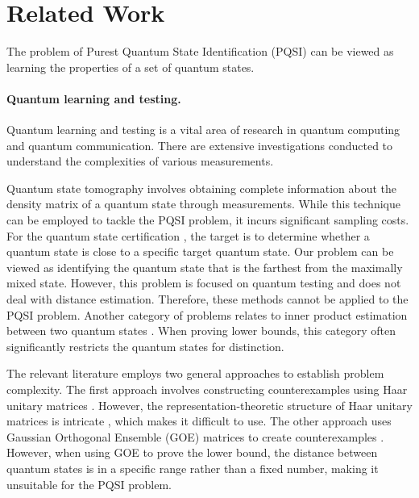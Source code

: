 \section{Related Work}
\label{sec: related_work}

The problem of Purest Quantum State Identification (PQSI) can be viewed as learning the properties of a set of quantum states.

\paragraph{Quantum learning and testing.}  Quantum learning and testing \cite{montanaro2013survey, aharonov2022quantum} is a vital area of research in quantum computing and quantum communication. There are extensive investigations conducted to understand the complexities of various measurements. 

Quantum state tomography \cite{banaszek2013focus, gross2010quantum, chen2023does, chen2022exponential} involves obtaining complete information about the density matrix of a quantum state through measurements. While this technique can be employed to tackle the PQSI problem, it incurs significant sampling costs. For the quantum state certification \cite{bubeck2020entanglement,chen2022tight,wright2016learn,chen2022toward}, the target is to determine whether a quantum state is close to a specific target quantum state. Our problem can be viewed as identifying the quantum state that is the farthest from the maximally mixed state. However, this problem is focused on quantum testing and does not deal with distance estimation. Therefore, these methods cannot be applied to the PQSI problem. Another category of problems relates to inner product estimation between two quantum states \cite{anshu2022distributed,hinsche2024efficient, zhu2022cross,huang2020predicting}. When proving lower bounds, this category often significantly restricts the quantum states for distinction. 

The relevant literature employs two general approaches to establish problem complexity. The first approach involves constructing counterexamples using Haar unitary matrices \cite{anshu2022distributed,chen2022exponential,chen2022toward, bubeck2020entanglement}. However, the representation-theoretic structure of Haar unitary matrices is intricate \cite{mele2024introduction}, which makes it difficult to use. The other approach uses Gaussian Orthogonal Ensemble (GOE) matrices to create counterexamples \cite{chen2022tight,chen2023does}. However, when using GOE to prove the lower bound, the distance between quantum states is in a specific range rather than a fixed number, making it unsuitable for the PQSI problem. 

